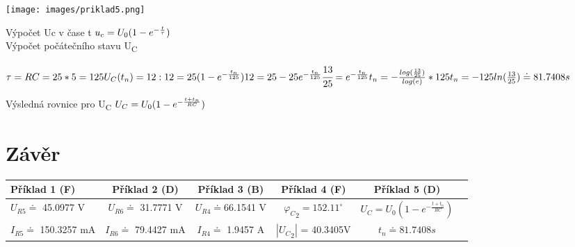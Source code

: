 \documentclass[12pt,a4paper]{article} %
\begin{document}
        \centerline{
		\texttt{[image: images/priklad5.png]}
		}
	\clearpage
    Výpočet Uc v čase t
    \(
        \\u_c = U_0(1-e^{-\frac{t}{\tau}})
    \)
    \medskip
    \\Výpočet počátečního stavu U\textsubscript{C} 
    
    \(
        \tau = RC = 25*5 = 125
        \medskip
        \\U_C(t_n) = 12:
        \medskip
        \\12 = 25(1 - e^{-\frac{t_n}{125}})
        \medskip
        \\12 = 25 - 25e^{-\frac{t_n}{125}}
        \medskip
        \\\cfrac{13}{25} = e^{-\frac{t_n}{125}}
        \medskip
        \\t_n = - \frac{log(\frac{13}{25})}{log(e)} * 125
        \medskip
        \\t_n = -125ln(\frac{13}{25}) \doteq 81.7408 s
        \medskip
    \)
    \medskip
    
    Výsledná rovnice pro U\textsubscript{C}
    \(
       \\ U_C = U_0(1 - e^{-\frac{t+t_n}{RC}})
    \)
    
	\clearpage

   \section*{Závěr}
	
\begin{center}
    \tabcolsep=1pt\relax
    \small

    \begin{tabular}{|l|c|c|c|c|c|} \hline
         Příklad 1 (F) & Příklad 2 (D) & Příklad 3 (B) & Příklad 4 (F) & Příklad 5 (D) \\\hline
         
         $U_{R5} \doteq$ 45.0977 V & $U_{R6} \doteq$ 31.7771 V  &  $U_{R4} \doteq$66.1541 V  &  ${\varphi_C}_2 = 152.11^{\circ}$  &  $U_C = U_0(1 - e^{-\frac{t+t_n}{RC}})$ \\  \hline
         
         $I_{R5} \doteq$ 150.3257 mA & $I_{R6} \doteq$ 79.4427 mA  & $I_{R4} \doteq$ 1.9457 A       &  $|{U_C}_2|$ = 40.3405V  &  $t_n \doteq 81.7408 s$ \\ \hline
    \end{tabular}

\end{center}\medskip
\end{document}
